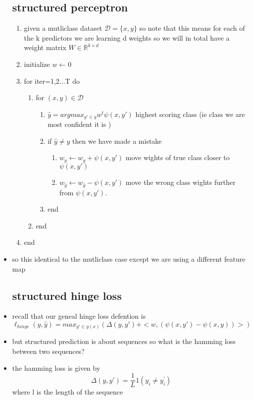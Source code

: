 \documentclass{article}
\begin{document}
\begin{itemize}
\subsection*{structured perceptron}
\begin{enumerate}
    \item given a mutliclass dataset $\mathcal{D}=\{x,y\}$ so note that this means for each of the k predictors we are learning d weights so we will in total have a weight matrix $W\in \mathbb{R}^{k \times d }$
    \item initialize $w\leftarrow 0$
    \item for iter=1,2...T do
    \begin{enumerate}
        \item for $(x,y)\in \mathcal{D}$
        \begin{enumerate}
        \item $\hat{y}=argmax_{y'\in y}w^t\psi({x,y'})$ highest scoring class (ie class we are most confident it is )
        \item if $\hat{y}\neq y$ then we have made a mistake  
        \begin{enumerate}
            \item $w_{y}\leftarrow w_y+\psi({x,y'})$ move wights of true class closer to $\psi({x,y'})$  
            \item $w_{\hat{y}}\leftarrow w_{\hat{y}}-\psi({x,y'})$ move the wrong class wights further from $\psi({x,y'})$.
        \end{enumerate}
        \item end 
    \end{enumerate}
    \item end 
    \end{enumerate}
    \item end 
\end{enumerate}
\item so this identical to the mutliclass case except we are using a different feature map
\subsection*{structured hinge loss}
\item recall that our geneal hinge loss defention is $\ell_{hinge}(y,\hat{y})=max_{y'\in y(x) }(\Delta(y,y')+<w, (\psi(x,y') -\psi(x,y) )>   )$
\item but structured prediction is about sequences so what is the hamming loss between two sequences?
\item the hamming loss is given by $$\Delta(y,y')=\frac{1}{L}1(y_i\neq y_{i}^{'})$$ where l is the length of the sequence

\end{itemize}
\end{document}
